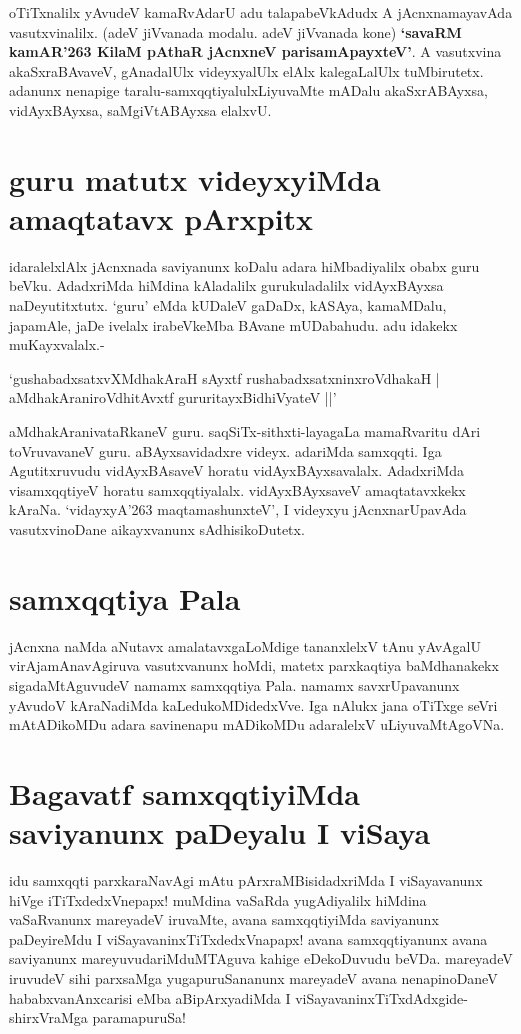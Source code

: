 oTiTxnalilx yAvudeV kamaRvAdarU adu talapabeVkAdudx A jAcnxnamayavAda vasutxvinalilx. (adeV jiVvanada modalu. adeV jiVvanada kone) \textbf{`savaRM kamAR\char'263 KilaM pAthaR\label{98c} jAcnxneV parisamApayxteV'}. A vasutxvina akaSxraBAvaveV, gAnadalUlx videyxyalUlx elAlx kalegaLalUlx tuMbirutetx. adanunx nenapige taralu-samxqqtiyalulxLiyuvaMte mADalu akaSxrABAyxsa, vidAyxBAyxsa, saMgiVtABAyxsa elalxvU.

\section*{guru matutx videyxyiMda amaqtatavx pArxpitx}

idaralelxlAlx jAcnxnada saviyanunx koDalu adara hiMbadiyalilx obabx guru beVku. AdadxriMda hiMdina kAladalilx gurukuladalilx vidAyxBAyxsa naDeyutitxtutx. `guru' eMda kUDaleV gaDaDx, kASAya, kamaMDalu, japamAle, jaDe ivelalx irabeVkeMba BAvane mUDabahudu. adu idakekx muKayxvalalx.-

\begin{shloka}
`gushabadxsatxvXMdhakAraH sAyxtf rushabadxsatxninxroVdhakaH |\label{98a}\\
aMdhakAraniroVdhitAvxtf gururitayxBidhiVyateV ||'
\end{shloka}

aMdhakAranivataRkaneV guru. saqSiTx-sithxti-layagaLa mamaRvaritu dAri toVruvavaneV guru. aBAyxsavidadxre videyx. adariMda samxqqti. Iga Agutitxruvudu vidAyxBAsaveV horatu vidAyxBAyxsavalalx. AdadxriMda visamxqqtiyeV horatu samxqqtiyalalx. vidAyxBAyxsaveV amaqtatavxkekx kAraNa. `vidayxyA\char'263 maqtamashunxteV',\label{99} I videyxyu jAcnxnarUpavAda vasutxvinoDane aikayxvanunx sAdhisikoDutetx.

\section*{samxqqtiya Pala}

jAcnxna naMda aNutavx amalatavxgaLoMdige tananxlelxV tAnu yAvAgalU virAjamAnavAgiruva vasutxvanunx hoMdi, matetx parxkaqtiya baMdhanakekx sigadaMtAguvudeV namamx samxqqtiya Pala. namamx savxrUpavanunx yAvudoV kAraNadiMda kaLedukoMDidedxVve. Iga nAlukx jana oTiTxge seVri mAtADikoMDu adara savinenapu mADikoMDu adaralelxV uLiyuvaMtAgoVNa. 

\section*{Bagavatf samxqqtiyiMda saviyanunx paDeyalu I viSaya}

idu samxqqti parxkaraNavAgi mAtu pArxraMBisidadxriMda I viSayavanunx hiVge iTiTxdedxVnepapx! muMdina vaSaRda yugAdiyalilx hiMdina vaSaRvanunx mareyadeV iruvaMte, avana samxqqtiyiMda saviyanunx paDeyireMdu I viSayavaninxTiTxdedxVnapapx! avana samxqqtiyanunx avana saviyanunx mareyuvudariMduMTAguva kahige eDekoDuvudu beVDa. mareyadeV iruvudeV sihi parxsaMga yugapuruSananunx mareyadeV avana nenapinoDaneV hababxvanAnxcarisi eMba aBipArxyadiMda I viSayavaninxTiTxdAdxgide- shirxVraMga paramapuruSa!

